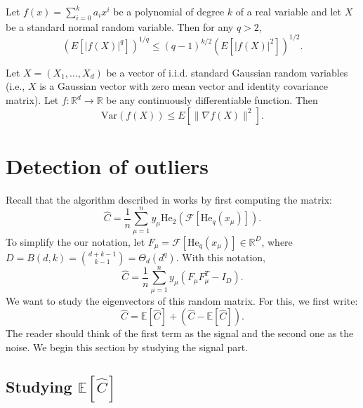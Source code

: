 \documentclass[]{article}
\numberwithin{equation}{section}
\theoremstyle{definition}
\newcommand{\RR}{\mathbb{R}}
\newcommand{\He}{\mathord{\mathrm{He}}}
\newcommand{\cF}{\mathcal{F}}
\begin{document}
\begin{lemma}
Let $f(x) = \sum_{i=0}^{k} a_i x^i$ be a polynomial of degree $k$ of a real variable and let $X$ be a standard normal random variable. Then for any $q > 2$,
$$
\left(E\left[|f(X)|^q\right]\right)^{1/q} \leq (q-1)^{k/2} \left(E\left[|f(X)|^2\right]\right)^{1/2}.
$$
\label{lemma:gaussian_hypercontractivity}
\end{lemma}

\begin{lemma}Let $X = (X_1, \ldots, X_d)$ be a vector of i.i.d. standard Gaussian random variables (i.e., $X$ is a Gaussian vector with zero mean vector and identity covariance matrix). Let $f : \mathbb{R}^d \to \mathbb{R}$ be any continuously differentiable function. Then
$$
\mathrm{Var}(f(X)) \leq E\left[\|\nabla f(X)\|^2\right] .
$$
\label{lemma:gaussian_poincare}
\end{lemma}

\section{Detection of outliers}

Recall that the algorithm described in  works by first computing the matrix: 
\begin{equation}
    \hat{C} = \dfrac{1}{n} \sum_{\mu =1}^{n} y_\mu \He_2(\cF[\He_{q}(x_\mu)]). 
\end{equation}
To simplify the our notation, let $F_\mu = \cF [\He_q(x_\mu)] \in \RR^{D}$, where $D = B(d,k) = \binom{d + k - 1}{k-1} = \Theta_{d}(d^{q})$. With this notation, 
\[
\hat{C} = \dfrac{1}{n} \sum_{\mu =1 }^{n} y_\mu \left ( F_\mu F_\mu^T - I_{D}\right ). 
\]
We want to study the eigenvectors of this random matrix. For this, we first write: 
\begin{equation}
    \hat{C} = \mathbb{E} \left [ \hat{C}\right ] + \left ( \hat{C} - \mathbb{E} \left [ \hat{C} \right ]\right ). 
\end{equation}
The reader should think of the first term as the signal and the second one as the noise. We begin this section by studying the signal part. 

\subsection{Studying \texorpdfstring{$\mathbb{E}\left[\hat{C} \right ]$}{E[C-hat (1)]}} 
\end{document}
